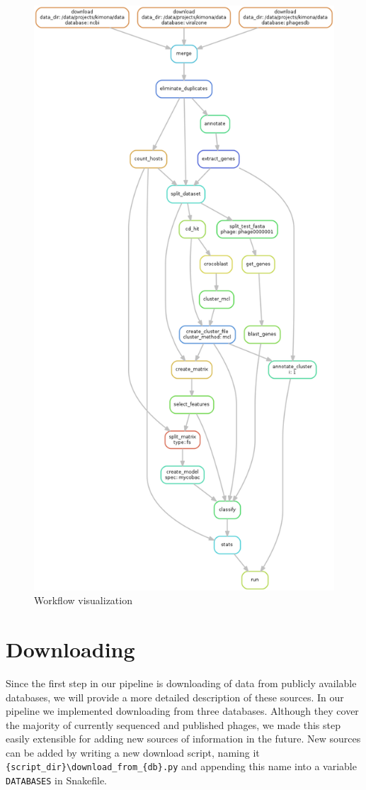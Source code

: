 \begin{figure}[h]
\includegraphics[height=\textheight]{./images/mcl.png}
\centering
\caption{Workflow visualization}
\label{fig:dag}
\end{figure}

\section{Downloading}
Since the first step in our pipeline is downloading of data from publicly available databases, we will provide a more detailed description of these sources.
In our pipeline we implemented downloading from three databases.
Although they cover the majority of currently sequenced and published phages, we made this step easily extensible for adding new sources of information in the future.
New sources can be added by writing a new download script, naming it \verb|{script_dir}\download_from_{db}.py| and appending this name into a variable \verb|DATABASES| in Snakefile.

